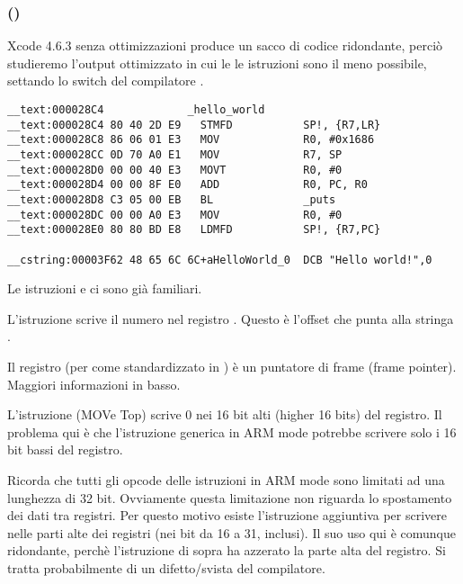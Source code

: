 \subsubsection{\OptimizingXcodeIV (\ARMMode)}

Xcode 4.6.3 senza ottimizzazioni produce un sacco di codice ridondante, perciò studieremo l'output ottimizzato in cui le
le istruzioni sono il meno possibile, settando lo switch del compilatore \Othree.

\begin{lstlisting}[caption=\OptimizingXcodeIV (\ARMMode),style=customasmARM]
__text:000028C4             _hello_world
__text:000028C4 80 40 2D E9   STMFD           SP!, {R7,LR}
__text:000028C8 86 06 01 E3   MOV             R0, #0x1686
__text:000028CC 0D 70 A0 E1   MOV             R7, SP
__text:000028D0 00 00 40 E3   MOVT            R0, #0
__text:000028D4 00 00 8F E0   ADD             R0, PC, R0
__text:000028D8 C3 05 00 EB   BL              _puts
__text:000028DC 00 00 A0 E3   MOV             R0, #0
__text:000028E0 80 80 BD E8   LDMFD           SP!, {R7,PC}

__cstring:00003F62 48 65 6C 6C+aHelloWorld_0  DCB "Hello world!",0
\end{lstlisting}

Le istruzioni  e  ci sono già familiari.


L'istruzione \MOV scrive il numero  nel registro  .
Questo è l'offset che punta alla stringa  .

Il registro  (per come standardizzato in \IOSABI) è un puntatore di frame (frame pointer). Maggiori informazioni in basso.

L'istruzione  (MOVe Top) scrive 0 nei 16 bit alti (higher 16 bits) del registro.
Il problema qui è che l'istruzione generica \MOV in ARM mode potrebbe scrivere solo i 16 bit bassi del registro.

Ricorda che tutti gli opcode delle istruzioni in ARM mode sono limitati ad una lunghezza di 32 bit. Ovviamente questa limitazione non riguarda lo spostamento dei dati tra registri.
Per questo motivo esiste l'istruzione aggiuntiva  per scrivere nelle parti alte dei registri (nei bit da 16 a 31, inclusi).
Il suo uso qui è comunque ridondante, perchè l'istruzione  di sopra ha azzerato la parte alta del registro.
Si tratta probabilmente di un difetto/svista del compilatore.

